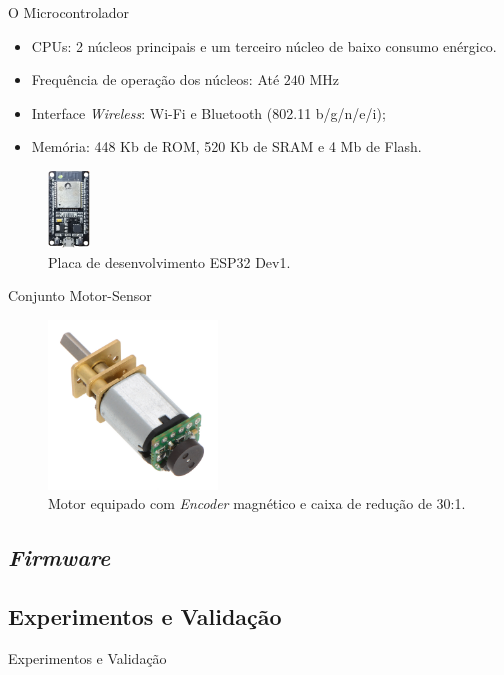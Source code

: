 \begin{frame}{O Microcontrolador}

\begin{itemize}
    \item CPUs: 2 núcleos principais e um terceiro núcleo de baixo consumo enérgico. 
    \item Frequência de operação dos núcleos: Até $240$ MHz
    \item Interface \emph{Wireless}: Wi-Fi e Bluetooth (802.11 b/g/n/e/i);
    \item Memória: 448 Kb de ROM, 520 Kb de SRAM e 4 Mb de Flash.
\end{itemize}

\begin{figure}[H]
    \centering
    \includegraphics[width=0.1\textwidth]{figuras/eletronica/esp32_kit.png}
    \caption{Placa de desenvolvimento ESP32 Dev1.}
\end{figure}

\end{frame}

\begin{frame}{Conjunto Motor-Sensor}
    \begin{figure}
        \centering
        \includegraphics[width=0.4\textwidth]{figuras/eletronica/motor_com_encoder.jpg}
        \caption{Motor equipado com \emph{Encoder} magnético e caixa de redução de 30:1.}
    \end{figure}
\end{frame}

\subsection{\emph{Firmware}}






\subsection{Experimentos e Validação}
\begin{frame}{Experimentos e Validação}
    
\end{frame}

